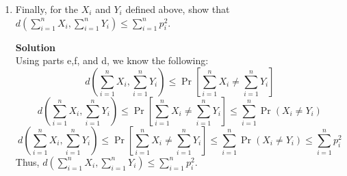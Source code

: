 \documentclass[11pt]{article}
\newenvironment{Parts}{\begin{enumerate}[label=(\alph*)]}{\end{enumerate}}
\newcommand*{\Part}{\item}
\newenvironment{Answer}{\vspace{10pt}\begin{mdframed}\textbf{Solution}\\}{\end{mdframed}\vfill\pagebreak[3]}
\newenvironment{Answer}{\vspace{10pt}}{\vfill\pagebreak[3]}
\begin{document}
\begin{Parts}
    \Part Finally, for the $X_i$ and $Y_i$ defined above, show that $d(\sum_{i=1}^n X_i, \sum_{i=1}^n Y_i) \leq \sum_{i=1}^n p_i^2$.
	\begin{Answer}
    Using parts e,f, and d, we know the following: $$d(\sum_{i=1}^n X_i, \sum_{i=1}^n Y_i) \leq \Pr[\sum_{i=1}^n X_i \not = \sum_{i=1}^n Y_i]$$ $$d(\sum_{i=1}^n X_i, \sum_{i=1}^n Y_i) \leq \Pr[\sum_{i=1}^n X_i \not = \sum_{i=1}^n Y_i] \leq \sum_{i=1}^n \Pr(X_i \neq Y_i)$$ $$d(\sum_{i=1}^n X_i, \sum_{i=1}^n Y_i) \leq \Pr[\sum_{i=1}^n X_i \not = \sum_{i=1}^n Y_i] \leq \sum_{i=1}^n \Pr(X_i \neq Y_i)\leq \sum_{i=1}^n p_i^2$$
    Thus, $d(\sum_{i=1}^n X_i, \sum_{i=1}^n Y_i) \leq \sum_{i=1}^n p_i^2$.
	\end{Answer}
\end{Parts}
\end{document}
